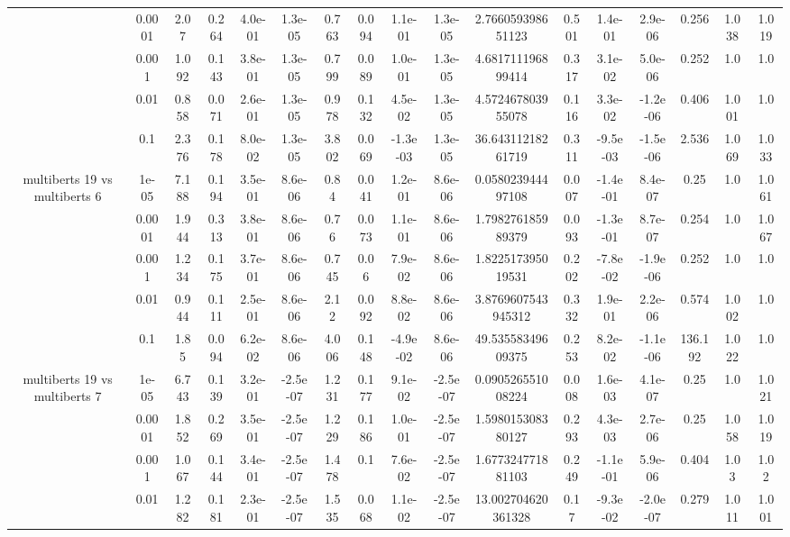 \begin{tabular}{|c|c|c|c|c|c|c|c|c|c|c|c|c|c|c|c|c|}
 & 0.0001 & 2.07 & 0.264 & 4.0e-01 & 1.3e-05 & 0.763 & 0.094 & 1.1e-01 & 1.3e-05 & 2.766059398651123 & 0.501 & 1.4e-01 & 2.9e-06 & 0.256 & 1.038 & 1.019 \\
 & 0.001 & 1.092 & 0.143 & 3.8e-01 & 1.3e-05 & 0.799 & 0.089 & 1.0e-01 & 1.3e-05 & 4.681711196899414 & 0.317 & 3.1e-02 & 5.0e-06 & 0.252 & 1.0 & 1.0 \\
 & 0.01 & 0.858 & 0.071 & 2.6e-01 & 1.3e-05 & 0.978 & 0.132 & 4.5e-02 & 1.3e-05 & 4.572467803955078 & 0.116 & 3.3e-02 & -1.2e-06 & 0.406 & 1.001 & 1.0 \\
 & 0.1 & 2.376 & 0.178 & 8.0e-02 & 1.3e-05 & 3.802 & 0.069 & -1.3e-03 & 1.3e-05 & 36.64311218261719 & 0.311 & -9.5e-03 & -1.5e-06 & 2.536 & 1.069 & 1.033 \\
\hline
\multirow{5}{*}{multiberts 19 vs multiberts 6} & 1e-05 & 7.188 & 0.194 & 3.5e-01 & 8.6e-06 & 0.84 & 0.041 & 1.2e-01 & 8.6e-06 & 0.058023944497108 & 0.007 & -1.4e-01 & 8.4e-07 & 0.25 & 1.0 & 1.061 \\
 & 0.0001 & 1.944 & 0.313 & 3.8e-01 & 8.6e-06 & 0.76 & 0.073 & 1.1e-01 & 8.6e-06 & 1.798276185989379 & 0.093 & -1.3e-01 & 8.7e-07 & 0.254 & 1.0 & 1.067 \\
 & 0.001 & 1.234 & 0.175 & 3.7e-01 & 8.6e-06 & 0.745 & 0.06 & 7.9e-02 & 8.6e-06 & 1.822517395019531 & 0.202 & -7.8e-02 & -1.9e-06 & 0.252 & 1.0 & 1.0 \\
 & 0.01 & 0.944 & 0.111 & 2.5e-01 & 8.6e-06 & 2.12 & 0.092 & 8.8e-02 & 8.6e-06 & 3.8769607543945312 & 0.332 & 1.9e-01 & 2.2e-06 & 0.574 & 1.002 & 1.0 \\
 & 0.1 & 1.85 & 0.094 & 6.2e-02 & 8.6e-06 & 4.006 & 0.148 & -4.9e-02 & 8.6e-06 & 49.53558349609375 & 0.253 & 8.2e-02 & -1.1e-06 & 136.192 & 1.022 & 1.0 \\
\hline
\multirow{5}{*}{multiberts 19 vs multiberts 7} & 1e-05 & 6.743 & 0.139 & 3.2e-01 & -2.5e-07 & 1.231 & 0.177 & 9.1e-02 & -2.5e-07 & 0.090526551008224 & 0.008 & 1.6e-03 & 4.1e-07 & 0.25 & 1.0 & 1.021 \\
 & 0.0001 & 1.852 & 0.269 & 3.5e-01 & -2.5e-07 & 1.229 & 0.186 & 1.0e-01 & -2.5e-07 & 1.598015308380127 & 0.293 & 4.3e-03 & 2.7e-06 & 0.25 & 1.058 & 1.019 \\
 & 0.001 & 1.067 & 0.144 & 3.4e-01 & -2.5e-07 & 1.478 & 0.1 & 7.6e-02 & -2.5e-07 & 1.677324771881103 & 0.249 & -1.1e-01 & 5.9e-06 & 0.404 & 1.03 & 1.02 \\
 & 0.01 & 1.282 & 0.181 & 2.3e-01 & -2.5e-07 & 1.535 & 0.068 & 1.1e-02 & -2.5e-07 & 13.002704620361328 & 0.17 & -9.3e-02 & -2.0e-07 & 0.279 & 1.011 & 1.001 \\

\end{tabular}
